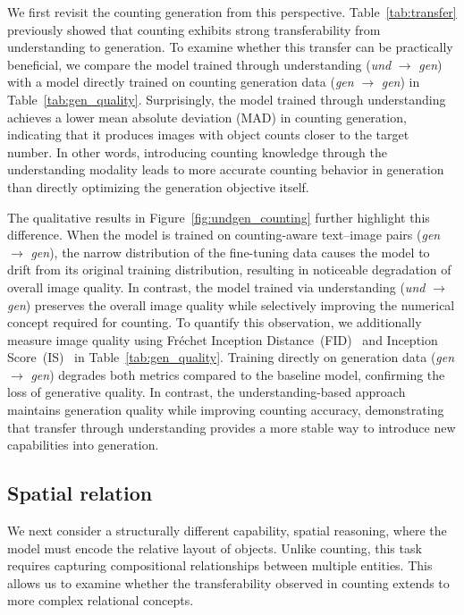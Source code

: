 We first revisit the counting generation from this perspective. Table~\ref{tab:transfer} previously showed that counting exhibits strong transferability from understanding to generation. To examine whether this transfer can be practically beneficial, we compare the model trained through understanding (\textit{und} $\rightarrow$ \textit{gen}) with a model directly trained on counting generation data (\textit{gen} $\rightarrow$ \textit{gen}) in Table~\ref{tab:gen_quality}. Surprisingly, the model trained through understanding achieves a lower mean absolute deviation (MAD) in counting generation, indicating that it produces images with object counts closer to the target number. In other words, introducing counting knowledge through the understanding modality leads to more accurate counting behavior in generation than directly optimizing the generation objective itself. 

The qualitative results in Figure~\ref{fig:undgen_counting} further highlight this difference. When the model is trained on counting-aware text–image pairs (\textit{gen} $\rightarrow$ \textit{gen}), the narrow distribution of the fine-tuning data causes the model to drift from its original training distribution, resulting in noticeable degradation of overall image quality. In contrast, the model trained via understanding (\textit{und} $\rightarrow$ \textit{gen}) preserves the overall image quality while selectively improving the numerical concept required for counting. To quantify this observation, we additionally measure image quality using Fréchet Inception Distance~(FID)~\cite{heusel2017fid} and Inception Score~(IS)~\cite{salimans2016isscore} in Table~\ref{tab:gen_quality}. Training directly on generation data (\textit{gen} $\rightarrow$ \textit{gen}) degrades both metrics compared to the baseline model, confirming the loss of generative quality. In contrast, the understanding-based approach maintains generation quality while improving counting accuracy, demonstrating that transfer through understanding provides a more stable way to introduce new capabilities into generation.

\subsection{Spatial relation}
\label{sec:spatial_rel}
We next consider a structurally different capability, spatial reasoning, where the model must encode the relative layout of objects. Unlike counting, this task requires capturing compositional relationships between multiple entities. This allows us to examine whether the transferability observed in counting extends to more complex relational concepts.

